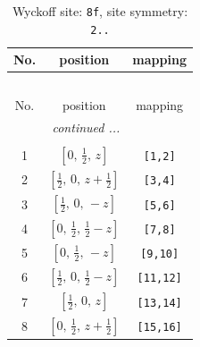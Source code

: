 \documentclass[fleqn,8pt]{jsarticle}
\begin{document}
\begin{longtable}{ccc}
\caption{Wyckoff site: {\tt 8f}, site symmetry: {\tt 2..}}
 \\
 \hline \hline
No. & position & mapping \\ \hline \endfirsthead

\multicolumn{2}{l}{\tablename\ \thetable{}} \\
 \hline \hline
No. & position & mapping \\ \hline \endhead

 \hline \hline
\multicolumn{2}{r}{\footnotesize\it continued ...} \\ \endfoot

 \hline \hline
\multicolumn{2}{r}{} \\ \endlastfoot

1 & $\left[ 0,\, \frac{1}{2},\, z \right]$ & {\tt [1,2]} \\ \hline
2 & $\left[ \frac{1}{2},\, 0,\, z + \frac{1}{2} \right]$ & {\tt [3,4]} \\ \hline
3 & $\left[ \frac{1}{2},\, 0,\, - z \right]$ & {\tt [5,6]} \\ \hline
4 & $\left[ 0,\, \frac{1}{2},\, \frac{1}{2} - z \right]$ & {\tt [7,8]} \\ \hline
5 & $\left[ 0,\, \frac{1}{2},\, - z \right]$ & {\tt [9,10]} \\ \hline
6 & $\left[ \frac{1}{2},\, 0,\, \frac{1}{2} - z \right]$ & {\tt [11,12]} \\ \hline
7 & $\left[ \frac{1}{2},\, 0,\, z \right]$ & {\tt [13,14]} \\ \hline
8 & $\left[ 0,\, \frac{1}{2},\, z + \frac{1}{2} \right]$ & {\tt [15,16]} \\
\end{longtable}
\renewcommand{\arraystretch}{1.2}
\end{document}
